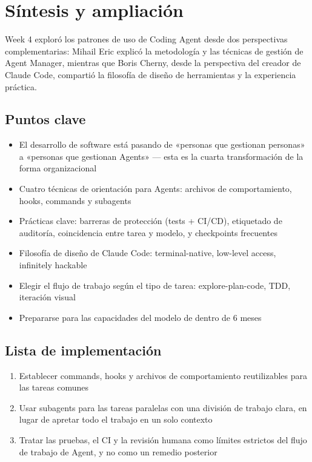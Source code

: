 \section{Síntesis y ampliación}

Week 4 exploró los patrones de uso de Coding Agent desde dos perspectivas complementarias: Mihail Eric explicó la metodología y las técnicas de gestión de Agent Manager, mientras que Boris Cherny, desde la perspectiva del creador de Claude Code, compartió la filosofía de diseño de herramientas y la experiencia práctica.

\subsection{Puntos clave}

\begin{itemize}
    \item El desarrollo de software está pasando de «personas que gestionan personas» a «personas que gestionan Agents» — esta es la cuarta transformación de la forma organizacional
    \item Cuatro técnicas de orientación para Agents: archivos de comportamiento, hooks, commands y subagents
    \item Prácticas clave: barreras de protección (tests + CI/CD), etiquetado de auditoría, coincidencia entre tarea y modelo, y checkpoints frecuentes
    \item Filosofía de diseño de Claude Code: terminal-native, low-level access, infinitely hackable
    \item Elegir el flujo de trabajo según el tipo de tarea: explore-plan-code, TDD, iteración visual
    \item Prepararse para las capacidades del modelo de dentro de 6 meses
\end{itemize}

\subsection{Lista de implementación}

\begin{enumerate}
    \item Establecer commands, hooks y archivos de comportamiento reutilizables para las tareas comunes
    \item Usar subagents para las tareas paralelas con una división de trabajo clara, en lugar de apretar todo el trabajo en un solo contexto
    \item Tratar las pruebas, el CI y la revisión humana como límites estrictos del flujo de trabajo de Agent, y no como un remedio posterior
\end{enumerate}

